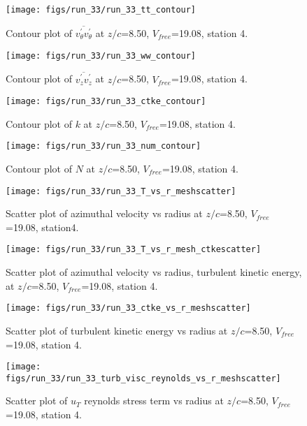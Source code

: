 \begin{figure}[H]
\centering
\texttt{[image: figs/run\_33/run\_33\_tt\_contour]}
\caption{Contour plot of $\overline{v_{\theta}^{\prime} v_{\theta}^{\prime}}$ at $z/c$=8.50, $V_{free}$=19.08, station 4.}
\end{figure}


\begin{figure}[H]
\centering
\texttt{[image: figs/run\_33/run\_33\_ww\_contour]}
\caption{Contour plot of $\overline{v_{z}^{\prime} v_{z}^{\prime}}$ at $z/c$=8.50, $V_{free}$=19.08, station 4.}
\end{figure}


\begin{figure}[H]
\centering
\texttt{[image: figs/run\_33/run\_33\_ctke\_contour]}
\caption{Contour plot of $k$ at $z/c$=8.50, $V_{free}$=19.08, station 4.}
\end{figure}


\begin{figure}[H]
\centering
\texttt{[image: figs/run\_33/run\_33\_num\_contour]}
\caption{Contour plot of $N$ at $z/c$=8.50, $V_{free}$=19.08, station 4.}
\end{figure}


\begin{figure}[H]
\centering
\texttt{[image: figs/run\_33/run\_33\_T\_vs\_r\_meshscatter]}
\caption{Scatter plot of azimuthal velocity vs radius at $z/c$=8.50, $V_{free}$=19.08, station4.}
\end{figure}


\begin{figure}[H]
\centering
\texttt{[image: figs/run\_33/run\_33\_T\_vs\_r\_mesh\_ctkescatter]}
\caption{Scatter plot of azimuthal velocity vs radius, turbulent kinetic energy, at $z/c$=8.50, $V_{free}$=19.08, station 4.}
\end{figure}


\begin{figure}[H]
\centering
\texttt{[image: figs/run\_33/run\_33\_ctke\_vs\_r\_meshscatter]}
\caption{Scatter plot of turbulent kinetic energy vs radius at $z/c$=8.50, $V_{free}$=19.08, station 4.}
\end{figure}


\begin{figure}[H]
\centering
\texttt{[image: figs/run\_33/run\_33\_turb\_visc\_reynolds\_vs\_r\_meshscatter]}
\caption{Scatter plot of $
u_T$ reynolds stress term vs radius at $z/c$=8.50, $V_{free}$=19.08, station 4.}
\end{figure}


